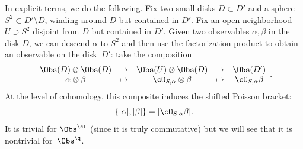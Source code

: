 \documentclass[10pt]{amsart}
\begin{document}
In explicit terms, we do the following.
Fix two small disks $D \subset D'$ and a sphere $S^2 \subset D' \setminus D$, winding around $D$ but contained in $D'$.
Fix an open neighborhood $U \supset S^2$ disjoint from $D$ but contained in $D'$.
Given two observables $\alpha, \beta$ in the disk $D$, we can descend $\alpha$ to $S^2$ and then use the factorization product to obtain an observable on the disk~$D'$:
take the composition
\[
\begin{array}{ccccc}
\Obs(D) \otimes \Obs(D) & \to & \Obs(U) \otimes \Obs(D) & \to & \Obs(D')\\
\alpha \otimes \beta & \mapsto & \cO_{S,\alpha} \otimes \beta & \mapsto & \cO_{S,\alpha} \beta
\end{array}.
\]
At the level of cohomology, this composite induces the shifted Poisson bracket:
\[
\{[\alpha], [\beta] \} = [\cO_{S,\alpha} \beta].
\]
It is trivial for $\Obs^\cl$ (since it is truly commutative) but we will see that it is nontrivial for~$\Obs^\q$.
\end{document}
